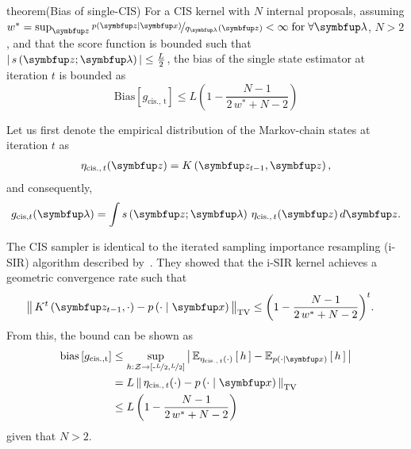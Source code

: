 
\begin{theoremEnd}{theorem}(Bias of single-CIS)
  For a CIS kernel with \(N\) internal proposals,
  assuming \(w^* = \sup_{\vz} \nicefrac{p\left(\vz\mid\vx\right)}{q_{\vlambda}\left(\vz\right)} < \infty\; \text{for} \; \forall \vlambda \), \(N > 2\), and that the score function is bounded such that \(\left|\,s\left(\vz; \vlambda\right)\,\right| \leq \frac{L}{2}\), the bias of the single state estimator at iteration \(t\) is bounded as
  {\small
  \[
    \mathrm{Bias}\left[ g_{\mathrm{cis.,\, t}} \right] \leq L \left(1 - \frac{N - 1}{2\,w^* + N - 2}\right)
  \]
  }
\end{theoremEnd}
\begin{proofEnd}
  Let us first denote the empirical distribution of the Markov-chain states at iteration \(t\) as
  \begin{align}
    \eta_{\mathrm{cis.},\, t}(\vz) = K\left(\vz_{t-1}, \vz\right),
  \end{align}
  and consequently,
  \begin{align}
      g_{\mathrm{cis}, t}(\vlambda) = \int s\left(\vz; \vlambda\right) \, \eta_{\mathrm{cis.},\, t}(\vz) \, d\vz.
  \end{align}

  The CIS sampler is identical to the iterated sampling importance resampling (i-SIR) algorithm described by~\citet{andrieu_uniform_2018}.
  They showed that the i-SIR kernel achieves a geometric convergence rate such that
  \begin{align}
    \DTV{K^{t}\left(\vz_{t-1},\cdot\right)}{p\left(\cdot\mid\vx\right)}
    &\leq {\left(1 - \frac{N - 1}{2\,w^* + N - 2}\right)}^t.
  \end{align}
  From this, the bound can be shown as
  \begin{align}
    \mathrm{bias}\left[ g_{\mathrm{cis., t}} \right]
    &\leq \sup_{h : \mathcal{Z} \rightarrow \left[ \text{-}\nicefrac{L}{2}, \nicefrac{L}{2} \right]} \left|\, \Esub{\eta_{\mathrm{cis.},\, t}(\cdot)}{h} - \Esub{p(\cdot\mid\vx)}{h} \,\right| \\
    &= L \, \DTV{ \eta_{\mathrm{cis.},\, t}(\cdot) }{p\left(\cdot\mid\vx\right)}  \\
    &\leq L \, {\left(1 - \frac{N - 1}{2\,w^* + N - 2}\right)}
  \end{align}
  given that \(N > 2\).
\end{proofEnd}

